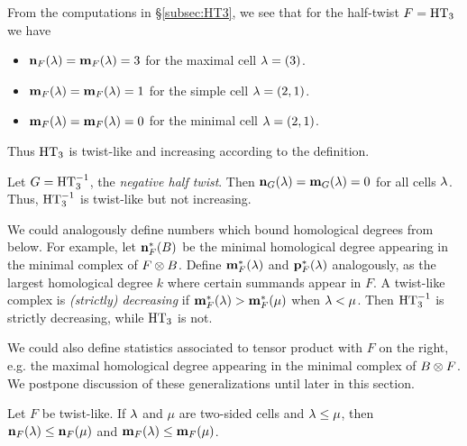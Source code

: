 \begin{example}
From the computations in \S \ref{subsec:HT3}, we see that for the half-twist $F=\operatorname{HT}_3$ we have
\begin{itemize}
\item ${\mathbf n}_F(\lambda)={\mathbf m}_F(\lambda)=3$ for the maximal cell $\lambda=(3)$.
\item ${\mathbf m}_F(\lambda)={\mathbf m}_F(\lambda)=1$ for the simple cell $\lambda=(2,1)$.
\item ${\mathbf m}_F(\lambda)={\mathbf m}_F(\lambda)=0$ for the minimal cell $\lambda=(2,1)$.
\end{itemize}
Thus $\operatorname{HT}_3$ is twist-like and increasing according to the definition.
\end{example}

\begin{example} Let $G = \operatorname{HT}_3^{-1}$, the \emph{negative half twist}. Then ${\mathbf n}_G(\lambda)={\mathbf m}_G(\lambda)=0$ for all cells $\lambda$.  Thus, $\operatorname{HT}_3^{-1}$ is twist-like but not increasing.
\end{example}

\begin{remark} \label{rmk:frombelow} We could analogously define numbers which bound homological degrees from below. For example, let ${\mathbf n}^\ast_F(B)$ be the minimal homological degree appearing in the minimal complex of $F \otimes B$. Define ${\mathbf m}^\ast_F(\lambda)$ and ${\mathbf p}^\ast_F(\lambda)$ analogously, as the largest homological degree $k$ where certain summands appear in $F$. A twist-like complex is \emph{(strictly) decreasing} if ${\mathbf m}_F^\ast(\lambda)>{\mathbf m}_F^\ast(\mu)$ when $\lambda<\mu$. Then $\operatorname{HT}_3^{-1}$ is strictly decreasing, while $\operatorname{HT}_3$ is not. \end{remark}
	
\begin{remark} We could also define statistics associated to tensor product with $F$ on the right, e.g. the maximal homological degree appearing in the minimal complex of $B \otimes F$. We postpone discussion of these generalizations until later in this section. \end{remark}




\begin{lemma} \label{lem:orderedeasy}
Let $F$ be twist-like.  If $\lambda$ and $\mu$ are two-sided cells and $\lambda \le \mu$, then ${\mathbf n}_F(\lambda) \le {\mathbf n}_F(\mu)$ and ${\mathbf m}_F(\lambda) \le {\mathbf m}_F(\mu)$. \end{lemma}

